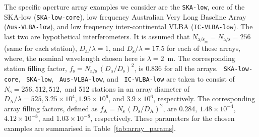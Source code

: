 \documentclass[
  journal=pasa,
  manuscript=article-type,
  year=2020,
  volume=37,
]{cup-journal}
\begin{document}
The specific aperture array examples we consider are the \texttt{SKA-low}, core of the SKA-low (\texttt{SKA-low-core}), low frequency Australian Very Long Baseline Array (\texttt{Aus-VLBA-low}), and low frequency inter-continental VLBA (\texttt{IC-VLBA-low}). The last two are hypothetical interferometers. It is assumed that $N_{\textrm{a/s}_m}=N_\textrm{a/s}=256$ (same for each station), $D_\textrm{a}/\lambda=1$, and $D_\textrm{s}/\lambda=17.5$ for each of these arrays, where, the nominal wavelength chosen here is $\lambda=2$~m. The corresponding station filling factor, $f_\textrm{s}=N_\textrm{a/s}\,(D_\textrm{a}/D_\textrm{s})^2$, is 0.836 for all the arrays. ~\texttt{SKA-low-core}, ~\texttt{SKA-low}, ~\texttt{Aus-VLBA-low}, and ~\texttt{IC-VLBA-low} are taken to consist of $N_\textrm{s}=256, 512, 512,$ and 512 stations in an array diameter of $D_\textrm{A}/\lambda=525, 3.25\times 10^4, 1.95\times 10^6$, and $3.9\times 10^6$, respectively. The corresponding array filling factors, defined as $f_\textrm{A}=N_\textrm{s}\,(D_\textrm{s}/D_\textrm{A})^2$, are 0.284, $1.48\times 10^{-4}$, $4.12\times 10^{-8}$, and $1.03\times 10^{-8}$, respectively. These parameters for the chosen examples are summarised in Table~\ref{tab:array_params}. 

\end{document}
